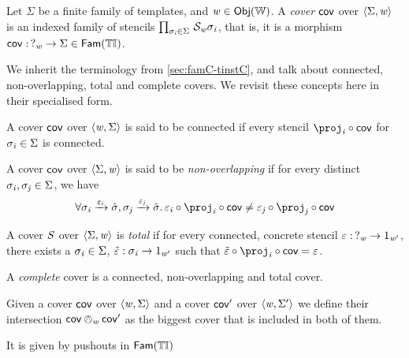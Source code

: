 \begin{definition}[Cover]
    Let $\Sigma$ be a finite family of templates, and $\mathit{w} \in \mathsf{Obj}({\mathbb{W}})$.
    A \emph{cover} $\mathsf{cov}$ over $\langle\Sigma, \mathit{w}\rangle$ is an indexed family of stencils $\prod_{\sigma_{\mathit{i}} \in \Sigma}\, \mathcal{S}_{\mathit{w}}{\sigma_{\mathit{i}}}$,
    that is, it is a morphism $\mathsf{cov} :\, ?_{\mathit{w}} \to \Sigma \in \mathsf{Fam}({{\mathbb{T}\mathbb{I}}})$.
\end{definition}

We inherit the terminology from \cref{sec:famC-tinstC}, and talk about connected, non-overlapping, total and complete covers.
We revisit these concepts here in their specialised form.

\begin{definition}
    A cover $\mathsf{cov}$ over $\langle\mathit{w}, \Sigma\rangle$ is said to be connected if every stencil $\proj_\vi \comp \cov$ for $\sigma_{\mathit{i}} \in \Sigma$ is connected.
\end{definition}

\begin{definition}
    A cover $\mathsf{cov}$ over $\langle\Sigma, \mathit{w}\rangle$ is said to be \emph{non-overlapping} if 
    for every distinct $\sigma_{\mathit{i}}, \sigma_{\mathit{j}} \in \Sigma$, we have
    \[ \AllTwo{\sigma_\vi \xto{\me_\vi} \hat\sigma}{\sigma_\vj \xto{\me_\vj} \hat\sigma} 
        \me_\vi \comp \proj_\vi \comp \cov \neq \me_\vj \comp \proj_\vj \comp \cov \]
\end{definition}

\begin{definition}
    A cover $\mathit{S}$ over $\langle\Sigma, \mathit{w}\rangle$ is \emph{total} if for every connected, concrete stencil $\varepsilon :\, ?_{\mathit{w}} \to 1_{\mathit{w}'}$,
    there exists a $\sigma_{\mathit{i}} \in \Sigma$, $\tilde{\varepsilon} : \sigma_{\mathit{i}} \to 1_{\mathit{w}'}$ such that $\tilde\me \comp \proj_\vi \comp \cov = \me$.
\end{definition}

\begin{definition}
    A \emph{complete} cover is a connected, non-overlapping and total cover.
\end{definition}

\begin{definition}
Given a cover $\mathsf{cov}$ over $\langle\mathit{w}, \Sigma\rangle$ and a cover $\mathsf{cov}'$ over $\langle\mathit{w}, \Sigma'\rangle$ 
we define their intersection $\mathsf{cov} \owedge_{\mathit{w}} \mathsf{cov}'$ as the biggest cover that is included in both of them.

It is given by pushouts in $\mathsf{Fam}({{\mathbb{T}\mathbb{I}}})$ 
\begin{center}
\end{center}
\end{definition}

